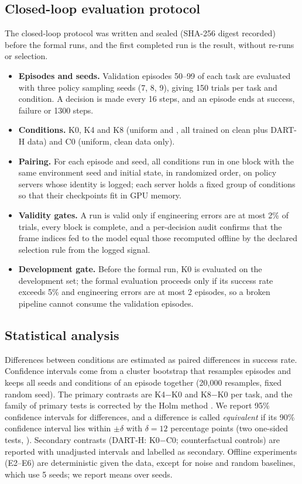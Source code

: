 \subsection{Closed-loop evaluation protocol}
\label{sec:protocol}
The closed-loop protocol was written and sealed (SHA-256 digest recorded) before the formal runs, and the first completed run is the result, without re-runs or selection.
\begin{itemize}
\item \textbf{Episodes and seeds.} Validation episodes 50--99 of each task are evaluated with three policy sampling seeds (7, 8, 9), giving 150 trials per task and condition. A decision is made every 16 steps, and an episode ends at success, failure or 1300 steps.
\item \textbf{Conditions.} K0, K4 and K8 (uniform and \pekm, all trained on clean plus DART-H data) and C0 (uniform, clean data only).
\item \textbf{Pairing.} For each episode and seed, all conditions run in one block with the same environment seed and initial state, in randomized order, on policy servers whose identity is logged; each server holds a fixed group of conditions so that their checkpoints fit in GPU memory.
\item \textbf{Validity gates.} A run is valid only if engineering errors are at most 2\% of trials, every block is complete, and a per-decision audit confirms that the frame indices fed to the model equal those recomputed offline by the declared selection rule from the logged signal.
\item \textbf{Development gate.} Before the formal run, K0 is evaluated on the development set; the formal evaluation proceeds only if its success rate exceeds 5\% and engineering errors are at most 2 episodes, so a broken pipeline cannot consume the validation episodes.
\end{itemize}

\subsection{Statistical analysis}
\label{sec:stats}
Differences between conditions are estimated as paired differences in success rate. Confidence intervals come from a cluster bootstrap that resamples episodes and keeps all seeds and conditions of an episode together (20{,}000 resamples, fixed random seed). The primary contrasts are K4$-$K0 and K8$-$K0 per task, and the family of primary tests is corrected by the Holm method \citep{holm1979simple}. We report 95\% confidence intervals for differences, and a difference is called \emph{equivalent} if its 90\% confidence interval lies within $\pm\delta$ with $\delta=12$ percentage points (two one-sided tests, \citealp{schuirmann1987tost}). Secondary contrasts (DART-H: K0$-$C0; counterfactual controls) are reported with unadjusted intervals and labelled as secondary. Offline experiments (E2--E6) are deterministic given the data, except for noise and random baselines, which use 5 seeds; we report means over seeds.


